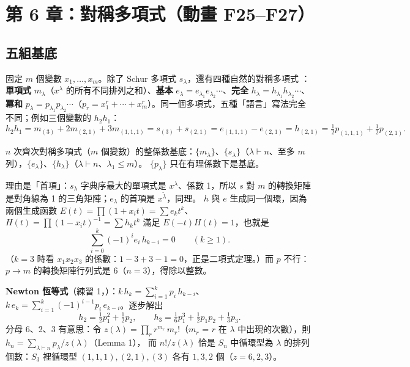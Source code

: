 
\section{第 6 章：對稱多項式（動畫 F25--F27）}\label{sec:f-ch6}

\subsection{五組基底}\label{sec:f-bases}

固定 $m$ 個變數 $x_1,\ldots,x_m$。除了 Schur 多項式 $s_\lambda$，還有四種自然的對稱多項式 ：
\textbf{單項式} $m_\lambda$（$x^\lambda$ 的所有不同排列之和）、\textbf{基本} $e_\lambda=e_{\lambda_1}e_{\lambda_2}\cdots$、\textbf{完全} $h_\lambda=h_{\lambda_1}h_{\lambda_2}\cdots$、
\textbf{冪和} $p_\lambda=p_{\lambda_1}p_{\lambda_2}\cdots$（$p_r=x_1^r+\cdots+x_m^r$）。同一個多項式，五種「語言」寫法完全不同；例如三個變數的 $h_2h_1$：
\[
h_2h_1=m_{(3)}+2m_{(2,1)}+3m_{(1,1,1)}=s_{(3)}+s_{(2,1)}=e_{(1,1,1)}-e_{(2,1)}=h_{(2,1)}=\tfrac12p_{(1,1,1)}+\tfrac12p_{(2,1)} .
\]

\begin{thmbox}[命題 1 \fulref{p.73}]
$n$ 次齊次對稱多項式（$m$ 個變數）的整係數基底：$\{m_\lambda\}$、$\{s_\lambda\}$（$\lambda\vdash n$、至多 $m$ 列），$\{e_\lambda\}$、$\{h_\lambda\}$（$\lambda\vdash n$、$\lambda_1\le m$）。
$\{p_\lambda\}$ 只在有理係數下是基底。
\end{thmbox}

理由是「首項」：$s_\lambda$ 字典序最大的單項式是 $x^\lambda$、係數 1，所以 $s$ 對 $m$ 的轉換矩陣是對角線為 1 的三角矩陣；$e_\lambda$ 的首項是 $x^{\tilde\lambda}$，同理。
$h$ 與 $e$ 生成同一個環，因為兩個生成函數 $E(t)=\prod(1+x_it)=\sum e_kt^k$、$H(t)=\prod(1-x_it)^{-1}=\sum h_kt^k$ 滿足 $E(-t)H(t)=1$，也就是
\[
\sum_{i=0}^{k}(-1)^i e_i\,h_{k-i}=0\qquad(k\ge1).
\]
（$k=3$ 時看 $x_1x_2x_3$ 的係數：$1-3+3-1=0$，正是二項式定理。）而 $p$ 不行：$p\to m$ 的轉換矩陣行列式是 6（$n=3$），得除以整數。

\textbf{Newton 恆等式}（練習 1，）：$k\,h_k=\sum_{i=1}^k p_i\,h_{k-i}$、$k\,e_k=\sum_{i=1}^k(-1)^{i-1}p_i\,e_{k-i}$。逐步解出
\[
h_2=\tfrac12p_1^2+\tfrac12p_2,\qquad h_3=\tfrac16p_1^3+\tfrac12p_1p_2+\tfrac13p_3 .
\]
分母 6、2、3 有意思：令 $z(\lambda)=\prod_r r^{m_r}\,m_r!$（$m_r$ = $r$ 在 $\lambda$ 中出現的次數），則 $h_n=\sum_{\lambda\vdash n}p_\lambda/z(\lambda)$（Lemma 1），
而 $n!/z(\lambda)$ 恰是 $S_n$ 中循環型為 $\lambda$ 的排列個數：$S_3$ 裡循環型 $(1,1,1),(2,1),(3)$ 各有 $1,3,2$ 個（$z=6,2,3$）。

